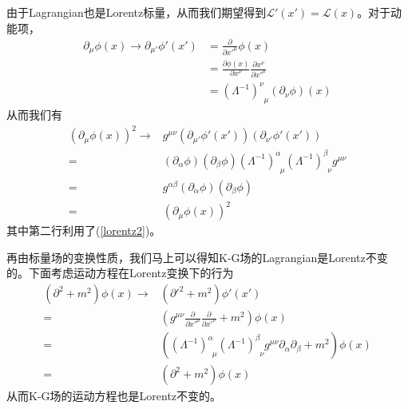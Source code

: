 由于Lagrangian也是Lorentz标量，从而我们期望得到$\mathcal{L}'(x')= \mathcal{L}(x)$。对于动能项，
\begin{equation}
\begin{aligned}
    \partial_{\mu}\phi(x)\rightarrow \partial_{\mu'}\phi'(x')&=\frac{\partial}{\partial {x'^{\mu}}}\phi(x)\\
    &=\frac{\partial \phi(x)}{\partial {x^{\nu}}}\frac{\partial x^{\nu}}{\partial x'^{\mu}}\\
    &=(\Lambda^{-1})^{\nu}_{\;\;\mu}(\partial_{\nu}\phi)(x)
    \end{aligned}
\end{equation}
从而我们有
\begin{equation}
\begin{aligned}
    (\partial_{\mu}\phi(x))^{2}\rightarrow & g^{\mu\nu}(\partial_{\mu'}\phi'(x'))(\partial_{\nu'}\phi'(x'))\\
    =&(\partial_{\alpha}\phi)(\partial_{\beta}\phi)(\Lambda^{-1})^{\alpha}_{\;\;\mu}(\Lambda^{-1})^{\beta}_{\;\;\nu}g^{\mu\nu}\\
    =&g^{\alpha \beta}(\partial_{\alpha}\phi)(\partial_{\beta}\phi)\\
    =&(\partial_{\mu}\phi(x))^{2}
    \end{aligned}
\end{equation}
其中第二行利用了(\ref{lorentz2})。

再由标量场的变换性质，我们马上可以得知K-G场的Lagrangian是Lorentz不变的。下面考虑运动方程在Lorentz变换下的行为
\begin{equation}
\begin{aligned}
    (\partial^{2}+m^{2})\phi(x)\rightarrow &(\partial'^{2}+m^{2})\phi'(x')\\
    =&\left(g^{\mu\nu}\frac{\partial}{\partial x'^{\mu}}\frac{\partial}{\partial x'^{\nu}}+m^{2}\right)\phi(x)\\
    =&\left((\Lambda^{-1})^{\alpha}_{\;\;\mu}(\Lambda^{-1})^{\beta}_{\;\;\nu}g^{\mu\nu}\partial_{\alpha}\partial_{\beta}+m^{2}\right)\phi(x)\\
    =&(\partial^{2}+m^{2})\phi(x)
    \end{aligned}
\end{equation}
从而K-G场的运动方程也是Lorentz不变的。

